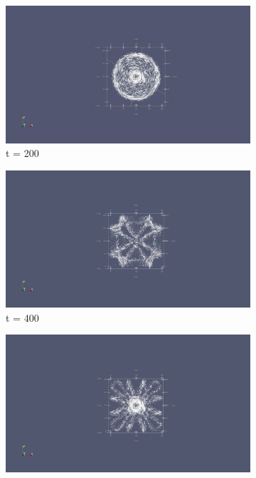 \begin{figure}[h!]
	\centering
    \begin{subfigure}{.49\textwidth}
    	\centering
    	\includegraphics[width=.95\linewidth]{Figures/FDTD2DE1}
    	\caption{t = 200}
    \end{subfigure}
    \begin{subfigure}{.49\textwidth}
    	\centering
    	\includegraphics[width=.95\linewidth]{Figures/FDTD2DE2}
    	\caption{t = 400}
    \end{subfigure}
    \begin{subfigure}{.49\textwidth}
    	\centering
    	\includegraphics[width=.95\linewidth]{Figures/FDTD2DE3}

\end{subfigure}
\end{figure}

